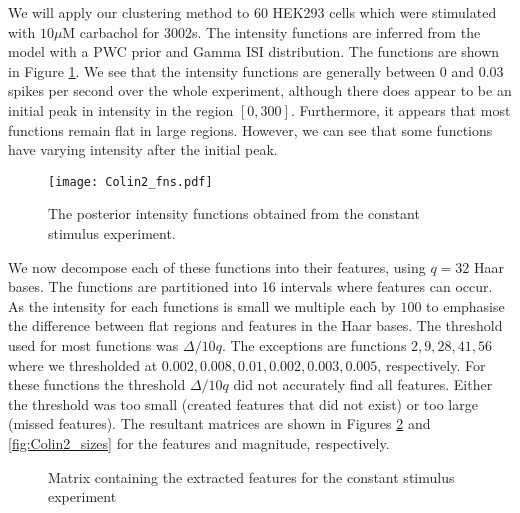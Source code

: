 \documentclass[12pt]{book} %
\begin{document}
We will apply our clustering method to $60$ HEK293 cells which were stimulated with $10 \mu\mathrm{M}$ carbachol for $3002$s. The intensity functions are inferred from the model with a PWC prior and Gamma ISI distribution. The functions are shown in Figure \ref{fig:Colin2_fns}. We see that the intensity functions are generally between $0$ and $0.03$  spikes per second over the whole experiment,  although there does appear to be an initial peak in intensity in the region $[0,300]$. Furthermore, it appears that most functions remain flat in large regions. However, we can see that some functions have varying intensity after the initial peak. 

  \begin{figure}[h!]
   \hrulefill
   \begin{center} 
    {\texttt{[image: Colin2\_fns.pdf]} }
    \end{center}     
    \caption{The posterior intensity functions obtained from the constant stimulus experiment.}
    \label{fig:Colin2_fns}
    \hrulefill
    \end{figure}

We now decompose each of these functions into their features, using $q = 32$ Haar bases. The functions are partitioned into 16 intervals where features can occur. As the intensity for each functions is small we multiple each by $100$ to emphasise the difference between flat regions and features in the Haar bases. The threshold used for most functions was $\Delta /10q$. The exceptions are functions $2,9,28,41,56$ where we thresholded at $0.002, 0.008, 0.01, 0.002, 0.003, 0.005$, respectively. For these functions the threshold $\Delta /10q$ did not accurately find all features. Either the threshold was too small (created features that did not exist) or too large (missed features). The resultant matrices are shown in Figures \ref{fig:Colin2_features} and \ref{fig:Colin2_sizes} for the features and magnitude, respectively. 



	\begin{figure}
  \begin{center} 
    \end{center}     
    \caption{Matrix containing the extracted features for the constant stimulus experiment }
    \label{fig:Colin2_features}
	\end{figure}
\end{document}
